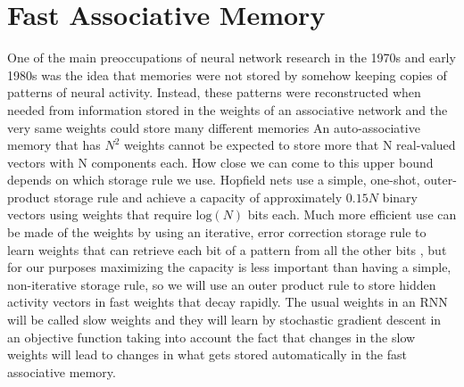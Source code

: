 \documentclass{article}
\begin{document}
\section{Fast Associative Memory}

One of the main preoccupations of neural network research in the 1970s and early 1980s \citep{willshaw1969non, kohonen1972correlation, anderson1981models, hopfield1982neural} was the idea that memories were not stored by somehow keeping copies of patterns of neural activity.  Instead, these patterns  were reconstructed when needed from information stored in the weights of an associative network and the very same weights could store many different memories
An auto-associative memory that has $N^2$ weights cannot be expected to store more that N real-valued vectors with N components each.   How close we can come to this upper bound depends on which storage rule we use. 
Hopfield nets use a simple, one-shot, outer-product storage rule and achieve a capacity of approximately $0.15N$ binary vectors using weights that require $\text{log}(N)$ bits each.  Much more efficient use can be made of the weights by using an iterative, error correction storage rule to learn weights that can retrieve each bit of a pattern from all the other bits \citep{gardner1988space}, but for our purposes maximizing the capacity is less important than having a simple, non-iterative storage rule, so we will use an outer product rule to store hidden activity vectors in fast weights that decay rapidly.  The usual weights in an RNN will be called slow weights and they will learn by stochastic gradient descent in an objective function taking into account the fact that changes in the slow weights will lead to changes in what gets stored automatically in the fast associative memory.
\end{document}
